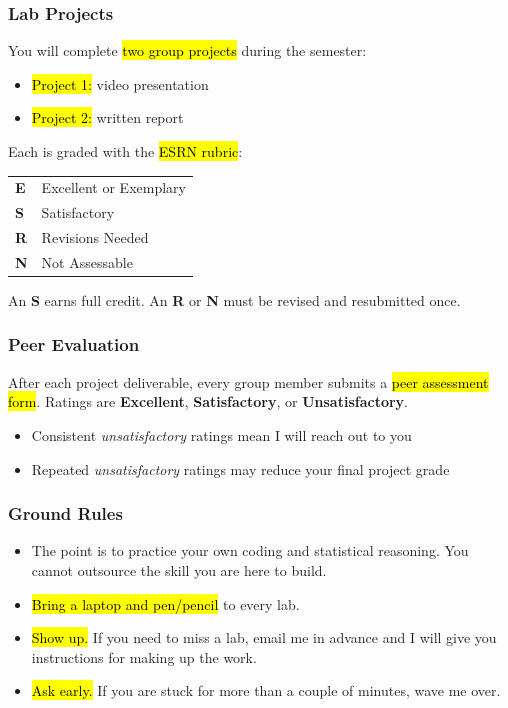 \documentclass[slidestop,compress,mathserif]{beamer}
\begin{document}
\begin{frame}
	\frametitle{Lab Projects}
	You will complete \hl{two group projects} during the semester:
	\vfill
	\begin{itemize}
		\item \hl{Project 1:} video presentation
		\item \hl{Project 2:} written report
	\end{itemize}
	\vfill
	Each is graded with the \hl{ESRN rubric}:
	\begin{center}
	\begin{tabular}{ll}
		\textbf{E} & Excellent or Exemplary \\
		\textbf{S} & Satisfactory \\
		\textbf{R} & Revisions Needed \\
		\textbf{N} & Not Assessable \\
	\end{tabular}
	\end{center}
	\vfill
	{\footnotesize An \textbf{S} earns full credit. An \textbf{R} or \textbf{N} must be revised and resubmitted once.}
\end{frame}

\begin{frame}
	\frametitle{Peer Evaluation}
	After each project deliverable, every group member submits a \hl{peer assessment form}.
	\vfill
	Ratings are \textbf{Excellent}, \textbf{Satisfactory}, or \textbf{Unsatisfactory}.
	\vfill
	\begin{itemize}
		\item Consistent \textit{unsatisfactory} ratings mean I will reach out to you
		\item Repeated \textit{unsatisfactory} ratings may reduce your final project grade
	\end{itemize}
	\vfill
\end{frame}

\begin{frame}
	\frametitle{Ground Rules}
	\begin{itemize}
		\item {} The point is to practice your own coding and statistical reasoning. You cannot outsource the skill you are here to build.
		\item \hl{Bring a laptop and pen/pencil} to every lab.
		\item \hl{Show up.} If you need to miss a lab, email me in advance and I will give you instructions for making up the work.
		\item \hl{Ask early.} If you are stuck for more than a couple of minutes, wave me over.
	\end{itemize}
\end{frame}
\end{document}
